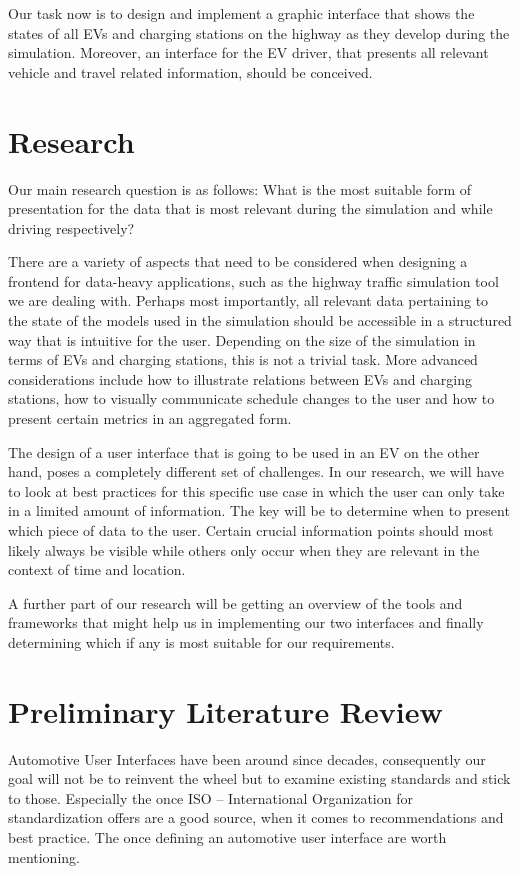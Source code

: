 \documentclass[hidelinks]{sig-alternate}
\begin{document}
Our task now is to design and implement a graphic interface that shows the states of all EVs and charging stations on
the highway as they develop during the simulation. Moreover, an interface for the EV driver, that presents all
relevant vehicle and travel related information, should be conceived.


\section{Research}

Our main research question is as follows: What is the most suitable form of presentation for the data that is most
relevant during the simulation and while driving respectively?

There are a variety of aspects that need to be considered when designing a frontend for data-heavy applications,
such as the highway traffic simulation tool we are dealing with. Perhaps most importantly, all relevant data
pertaining to the state of the models used in the simulation should be accessible in a structured way that is intuitive
for the user. Depending on the size of the simulation in terms of EVs and charging stations, this is not a trivial
task. More advanced considerations include how to illustrate relations between EVs and charging stations, how to
visually communicate schedule changes to the user and how to present certain metrics in an aggregated form.

The design of a user interface that is going to be used in an EV on the other hand, poses a completely different set
of challenges. In our research, we will have to look at best practices for this specific use case in which the user
can only take in a limited amount of information. The key will be to determine when to present which piece of
data to the user. Certain crucial information points should most likely always be visible while others only occur
when they are relevant in the context of time and location.

A further part of our research will be getting an overview of the tools and frameworks that might help us in
implementing our two interfaces and finally determining which if any is most suitable for our requirements.

\section{Preliminary Literature Review}
Automotive User Interfaces have been around since decades, consequently our goal will not be to reinvent the wheel but to examine existing standards and stick to those. Especially the once ISO – International Organization for standardization offers are a good source, when it comes to recommendations and best practice. The once defining an automotive user interface are worth mentioning. 
\end{document}
